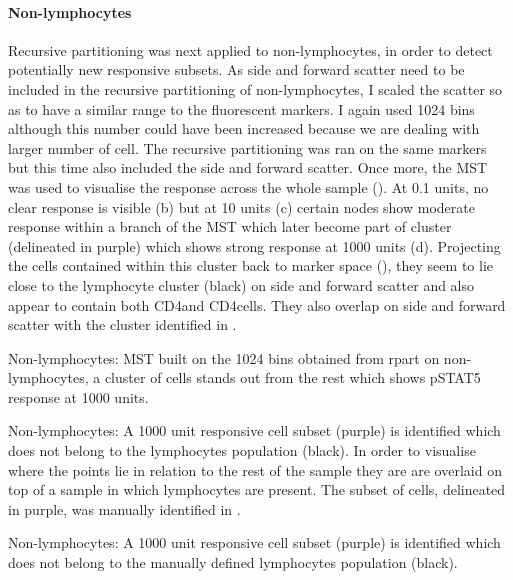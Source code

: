 \paragraph{Non-lymphocytes}

Recursive partitioning was next applied to non-lymphocytes, in order to detect potentially new responsive subsets.
As side and forward scatter need to be included in the recursive partitioning of non-lymphocytes,
I scaled the scatter so as to have a similar range to the fluorescent markers.
I again used 1024 bins although this number could have been increased because we are dealing with larger number of cell.
The recursive partitioning was ran on the same markers but this time also included the side and forward scatter.
Once more, the MST was used to visualise the response across the whole sample ().
At 0.1 units, no clear response is visible (b) but at 10 units
(c) certain nodes show moderate response within a branch of the MST which
later become part of cluster (delineated in purple) which shows strong response at 1000 units (d).
Projecting the cells contained within this cluster back to marker space (), 
they seem to lie close to the lymphocyte cluster (black) on side and forward scatter and also appear to contain both CD4\negative and CD4\positive cells.
They also overlap on side and forward scatter with the cluster identified in .


{ Non-lymphocytes: MST built on the 1024 bins obtained from rpart on non-lymphocytes, a cluster of cells stands out from the rest which shows pSTAT5 response at 1000 units.}
{
}

{ Non-lymphocytes:  A 1000 unit responsive cell subset (purple) is identified which does not belong to the lymphocytes population (black).  }
{
  In order to visualise where the points lie in relation to the rest of the sample they are are overlaid on top of a sample in which lymphocytes are present.
  The subset of cells, delineated in purple, was manually identified in .
}

{ Non-lymphocytes: A 1000 unit responsive cell subset (purple) is identified which does not belong to the manually defined lymphocytes population (black).  }
{
}

